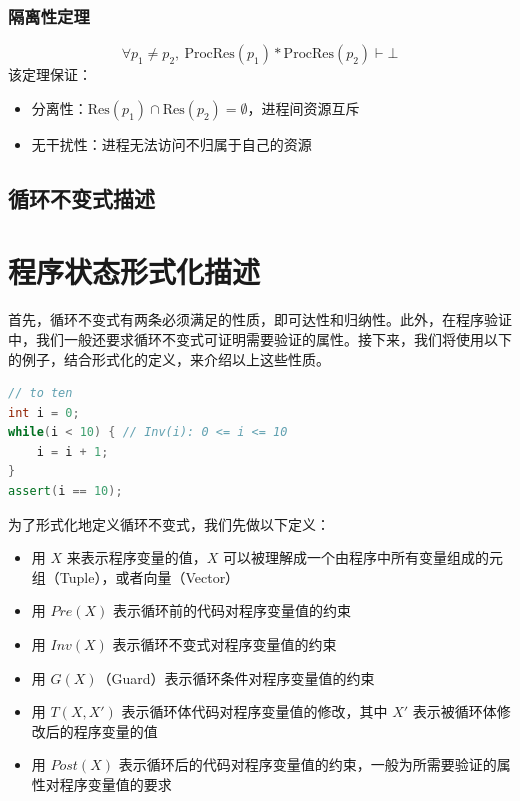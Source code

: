 \subsubsection{隔离性定理}
\begin{equation}
\forall p_1 \neq p_2,\ \mathrm{ProcRes}(p_1) \ast \mathrm{ProcRes}(p_2) \vdash \bot
\end{equation}
\noindent 该定理保证：
\begin{itemize}
    \item 分离性：$\mathrm{Res}(p_1) \cap \mathrm{Res}(p_2) = \emptyset$，进程间资源互斥
    \item 无干扰性：进程无法访问不归属于自己的资源
\end{itemize}
\subsection{循环不变式描述}
\section*{程序状态形式化描述}

首先，循环不变式有两条必须满足的性质，即可达性和归纳性。此外，在程序验证中，我们一般还要求循环不变式可证明需要验证的属性。接下来，我们将使用以下的例子，结合形式化的定义，来介绍以上这些性质。

\begin{lstlisting}[language=C++, caption=示例程序]
// to ten
int i = 0;
while(i < 10) { // Inv(i): 0 <= i <= 10
    i = i + 1;
}
assert(i == 10);
\end{lstlisting}

为了形式化地定义循环不变式，我们先做以下定义：

\begin{itemize}
    \item 用 $X$ 来表示程序变量的值，$X$ 可以被理解成一个由程序中所有变量组成的元组（Tuple），或者向量（Vector）
    
    \item 用 $Pre(X)$ 表示循环前的代码对程序变量值的约束
    
    \item 用 $Inv(X)$ 表示循环不变式对程序变量值的约束
    
    \item 用 $G(X)$（Guard）表示循环条件对程序变量值的约束
    
    \item 用 $T(X, X')$ 表示循环体代码对程序变量值的修改，其中 $X'$ 表示被循环体修改后的程序变量的值
    
    \item 用 $Post(X)$ 表示循环后的代码对程序变量值的约束，一般为所需要验证的属性对程序变量值的要求
\end{itemize}
